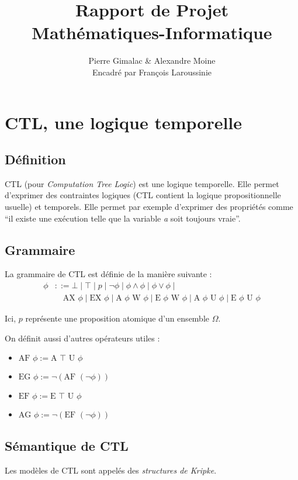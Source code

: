 \documentclass[10pt,a4paper]{article}
\author{Pierre Gimalac \& Alexandre Moine\\\small{Encadré par François Laroussinie}}
\title{Rapport de Projet\\Mathématiques-Informatique}
\begin{document}
\maketitle

\section{CTL, une logique temporelle}
\subsection{Définition}
CTL (pour \textit{Computation Tree Logic}) est une logique temporelle. Elle permet d'exprimer des contraintes logiques (CTL contient la logique propositionnelle usuelle) et temporels.
Elle permet par exemple d'exprimer des propriétés comme ``il existe une exécution telle que la variable \textit{a} soit toujours vraie''.

\subsection{Grammaire}
\label{op}
La grammaire de CTL est définie de la manière suivante :
\begin{align*}
\phi &::= \bot \mid \top \mid p \mid \neg \phi \mid \phi\land\phi \mid \phi\lor\phi \mid \\
&\quad \mbox{AX }\phi \mid \mbox{EX }\phi \mid
\mbox{A }\phi \mbox{ W } \phi \mid \mbox{E }\phi \mbox{ W } \phi \mid
\mbox{A }\phi \mbox{ U } \phi \mid \mbox{E }\phi \mbox{ U } \phi
\end{align*}

Ici, $p$ représente une proposition atomique d'un ensemble $\Omega$.

On définit aussi d'autres opérateurs utiles :
\begin{itemize}
	\item $\mbox{AF } \phi := \mbox{A } \top \mbox{ U } \phi$
	\item $\mbox{EG } \phi := \neg (\mbox{AF } (\neg \phi))$
	\item $\mbox{EF } \phi := \mbox{E } \top \mbox{ U } \phi$
	\item $\mbox{AG } \phi := \neg (\mbox{EF } (\neg \phi))$
\end{itemize}

\subsection{Sémantique de CTL}
Les modèles de CTL sont appelés des \emph{structures de Kripke}.
\end{document}
